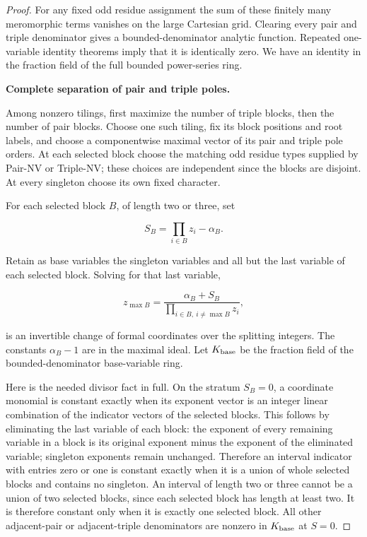 \documentclass[11pt,a4paper]{article}
\theoremstyle{definition}
\begin{document}
\begin{proof}
For any fixed odd residue assignment the sum of these finitely many meromorphic terms vanishes on the large Cartesian grid. Clearing every pair and triple denominator gives a bounded-denominator analytic function. Repeated one-variable identity theorems imply that it is identically zero. We have an identity in the fraction field of the full bounded power-series ring.

\par\medskip\noindent\textbf{Complete separation of pair and triple poles.}

Among nonzero tilings, first maximize the number of triple blocks, then the number of pair blocks. Choose one such tiling, fix its block positions and root labels, and choose a componentwise maximal vector of its pair and triple pole orders. At each selected block choose the matching odd residue types supplied by Pair-NV or Triple-NV; these choices are independent since the blocks are disjoint. At every singleton choose its own fixed character.

For each selected block \(B\), of length two or three, set

\[
S_B=\prod_{i\in B}z_i-\alpha_B.
\]

Retain as base variables the singleton variables and all but the last variable of each selected block. Solving for that last variable,

\[
z_{\max B}=\frac{\alpha_B+S_B}
                   {\prod_{i\in B,\ i\ne\max B}z_i},
\]

is an invertible change of formal coordinates over the splitting integers. The constants \(\alpha_B-1\) are in the maximal ideal. Let \(K_{\rm base}\) be the fraction field of the bounded-denominator base-variable ring.

Here is the needed divisor fact in full. On the stratum \(S_B=0\), a coordinate monomial is constant exactly when its exponent vector is an integer linear combination of the indicator vectors of the selected blocks. This follows by eliminating the last variable of each block: the exponent of every remaining variable in a block is its original exponent minus the exponent of the eliminated variable; singleton exponents remain unchanged. Therefore an interval indicator with entries zero or one is constant exactly when it is a union of whole selected blocks and contains no singleton. An interval of length two or three cannot be a union of two selected blocks, since each selected block has length at least two. It is therefore constant only when it is exactly one selected block. All other adjacent-pair or adjacent-triple denominators are nonzero in \(K_{\rm base}\) at \(S=0\).


\end{proof}
\end{document}
